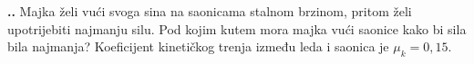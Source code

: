 

\noindent 
\textbf{
\thecjelina.\thezadatak.}
Majka želi vući svoga sina na saonicama stalnom brzinom, pritom želi upotrijebiti najmanju silu. Pod kojim kutem mora majka vući saonice kako bi sila bila najmanja? Koeficijent kinetičkog trenja između leda i saonica je $\mu_k=0,15$.

